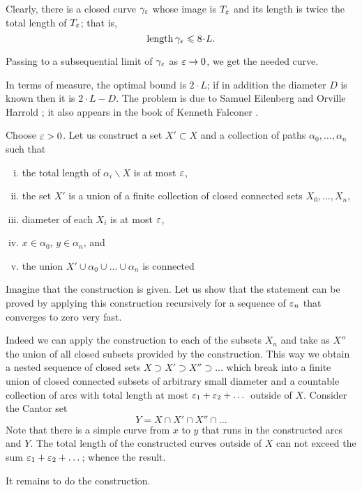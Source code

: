 Clearly, there is a closed curve $\gamma_\varepsilon$ whose image is $T_\varepsilon$ and its length is twice the total length of $T_\varepsilon$;
that is, 
\[\length\gamma_\eps\le 8\cdot L.\]

Passing to a subsequential limit of $\gamma_\varepsilon$ as $\varepsilon\to 0$,
we get the needed curve. \qeds

In terms of measure, the optimal bound is $2\cdot L$;
if in addition the diameter $D$ is known then it is $2\cdot L-D$.
The problem is due to 
Samuel Eilenberg 
and Orville Harrold 
\cite{eilenberg-harrold};
it also appears in the book of Kenneth Falconer \cite[see Exercise 3.5 in][]{falconer}.


Choose $\varepsilon>0$.
Let us construct a set $X'\subset X$ 
 and a collection of paths $\alpha_0,\dots,\alpha_n$ such that 
\begin{enumerate}[(i)]
\item the total length of $\alpha_i\backslash X$ is at most $\varepsilon$,
\item the set $X'$ is a union of a finite collection of closed connected sets $X_0,\dots,X_n$,
\item diameter of each $X_i$ is at most $\varepsilon$,
\item $x\in\alpha_0$, $y\in\alpha_n$, and
\item the union $X'\cup \alpha_0\cup\dots\cup\alpha_n$ is connected
\end{enumerate}

Imagine that the construction is given.
Let us show that the statement can be proved by applying this construction recursively for a sequence of $\varepsilon_n$ that converges to zero very fast.

Indeed we can apply the construction to each of the subsets $X_n$ and take as $X''$ the union of all closed subsets provided by the construction.
This way we obtain a nested sequence of closed sets $X\supset X'\supset X''\supset\dots$ which break into a finite union of closed connected subsets of arbitrary small diameter and a countable collection of arcs with total length at most $\varepsilon_1+\varepsilon_2+\dots$ 
outside of $X$.
Consider the Cantor set 
\[Y= X\cap  X'\cap X''\cap\dots\]
Note that there is a simple curve from $x$ to $y$ that runs in the constructed arcs and $Y$.
The total length of the constructed curves outside of $X$ can not exceed the sum
$\varepsilon_1+\varepsilon_2+\dots$;
whence the result.

It remains to do the construction.

